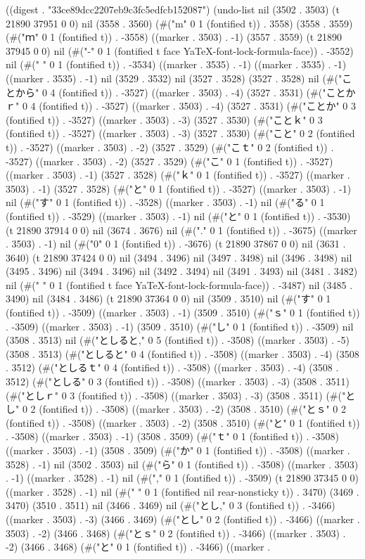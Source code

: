 
((digest . "33ce89dcc2207eb9c3fc5edfcb152087") (undo-list nil (3502 . 3503) (t 21890 37951 0 0) nil (3558 . 3560) (#("m" 0 1 (fontified t)) . 3558) (3558 . 3559) (#("ｍ" 0 1 (fontified t)) . -3558) ((marker . 3503) . -1) (3557 . 3559) (t 21890 37945 0 0) nil (#("-" 0 1 (fontified t face YaTeX-font-lock-formula-face)) . -3552) nil (#("
" 0 1 (fontified t)) . -3534) ((marker . 3535) . -1) ((marker . 3535) . -1) ((marker . 3535) . -1) nil (3529 . 3532) nil (3527 . 3528) (3527 . 3528) nil (#("ことから" 0 4 (fontified t)) . -3527) ((marker . 3503) . -4) (3527 . 3531) (#("ことかｒ" 0 4 (fontified t)) . -3527) ((marker . 3503) . -4) (3527 . 3531) (#("ことか" 0 3 (fontified t)) . -3527) ((marker . 3503) . -3) (3527 . 3530) (#("ことｋ" 0 3 (fontified t)) . -3527) ((marker . 3503) . -3) (3527 . 3530) (#("こと" 0 2 (fontified t)) . -3527) ((marker . 3503) . -2) (3527 . 3529) (#("こｔ" 0 2 (fontified t)) . -3527) ((marker . 3503) . -2) (3527 . 3529) (#("こ" 0 1 (fontified t)) . -3527) ((marker . 3503) . -1) (3527 . 3528) (#("ｋ" 0 1 (fontified t)) . -3527) ((marker . 3503) . -1) (3527 . 3528) (#("と" 0 1 (fontified t)) . -3527) ((marker . 3503) . -1) nil (#("す" 0 1 (fontified t)) . -3528) ((marker . 3503) . -1) nil (#("る" 0 1 (fontified t)) . -3529) ((marker . 3503) . -1) nil (#("と" 0 1 (fontified t)) . -3530) (t 21890 37914 0 0) nil (3674 . 3676) nil (#("." 0 1 (fontified t)) . -3675) ((marker . 3503) . -1) nil (#("0" 0 1 (fontified t)) . -3676) (t 21890 37867 0 0) nil (3631 . 3640) (t 21890 37424 0 0) nil (3494 . 3496) nil (3497 . 3498) nil (3496 . 3498) nil (3495 . 3496) nil (3494 . 3496) nil (3492 . 3494) nil (3491 . 3493) nil (3481 . 3482) nil (#(" " 0 1 (fontified t face YaTeX-font-lock-formula-face)) . -3487) nil (3485 . 3490) nil (3484 . 3486) (t 21890 37364 0 0) nil (3509 . 3510) nil (#("す" 0 1 (fontified t)) . -3509) ((marker . 3503) . -1) (3509 . 3510) (#("ｓ" 0 1 (fontified t)) . -3509) ((marker . 3503) . -1) (3509 . 3510) (#("し" 0 1 (fontified t)) . -3509) nil (3508 . 3513) nil (#("としると," 0 5 (fontified t)) . -3508) ((marker . 3503) . -5) (3508 . 3513) (#("としると" 0 4 (fontified t)) . -3508) ((marker . 3503) . -4) (3508 . 3512) (#("としるｔ" 0 4 (fontified t)) . -3508) ((marker . 3503) . -4) (3508 . 3512) (#("としる" 0 3 (fontified t)) . -3508) ((marker . 3503) . -3) (3508 . 3511) (#("としｒ" 0 3 (fontified t)) . -3508) ((marker . 3503) . -3) (3508 . 3511) (#("とし" 0 2 (fontified t)) . -3508) ((marker . 3503) . -2) (3508 . 3510) (#("とｓ" 0 2 (fontified t)) . -3508) ((marker . 3503) . -2) (3508 . 3510) (#("と" 0 1 (fontified t)) . -3508) ((marker . 3503) . -1) (3508 . 3509) (#("ｔ" 0 1 (fontified t)) . -3508) ((marker . 3503) . -1) (3508 . 3509) (#("か" 0 1 (fontified t)) . -3508) ((marker . 3528) . -1) nil (3502 . 3503) nil (#("ら" 0 1 (fontified t)) . -3508) ((marker . 3503) . -1) ((marker . 3528) . -1) nil (#("," 0 1 (fontified t)) . -3509) (t 21890 37345 0 0) ((marker . 3528) . -1) nil (#(" " 0 1 (fontified nil rear-nonsticky t)) . 3470) (3469 . 3470) (3510 . 3511) nil (3466 . 3469) nil (#("とし," 0 3 (fontified t)) . -3466) ((marker . 3503) . -3) (3466 . 3469) (#("とし" 0 2 (fontified t)) . -3466) ((marker . 3503) . -2) (3466 . 3468) (#("とｓ" 0 2 (fontified t)) . -3466) ((marker . 3503) . -2) (3466 . 3468) (#("と" 0 1 (fontified t)) . -3466) ((marker . 